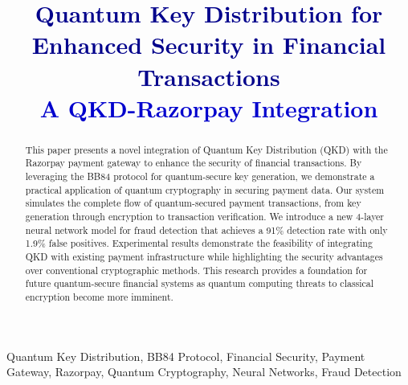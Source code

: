 \documentclass[onecolumn,a4paper,10pt]{IEEEtran}
\let\originalfloatbarrier\FloatBarrier
\renewcommand{\FloatBarrier}{\originalfloatbarrier}
\begin{document}

\title{
{\LARGE \textcolor{darkblue}{Quantum Key Distribution for Enhanced Security in Financial Transactions}}\\
\vspace{0.5em}
{\Large \textcolor{mediumblue}{A QKD-Razorpay Integration}}
}

\author{
}

\maketitle

\begin{abstract}
\normalfont\small
This paper presents a novel integration of Quantum Key Distribution (QKD) with the Razorpay payment gateway to enhance the security of financial transactions. By leveraging the BB84 protocol for quantum-secure key generation, we demonstrate a practical application of quantum cryptography in securing payment data. Our system simulates the complete flow of quantum-secured payment transactions, from key generation through encryption to transaction verification. We introduce a new 4-layer neural network model for fraud detection that achieves a 91\% detection rate with only 1.9\% false positives. Experimental results demonstrate the feasibility of integrating QKD with existing payment infrastructure while highlighting the security advantages over conventional cryptographic methods. This research provides a foundation for future quantum-secure financial systems as quantum computing threats to classical encryption become more imminent.
\end{abstract}

\begin{IEEEkeywords}
Quantum Key Distribution, BB84 Protocol, Financial Security, Payment Gateway, Razorpay, Quantum Cryptography, Neural Networks, Fraud Detection
\end{IEEEkeywords}

\tableofcontents
\thispagestyle{empty}
\FloatBarrier
\end{document}
